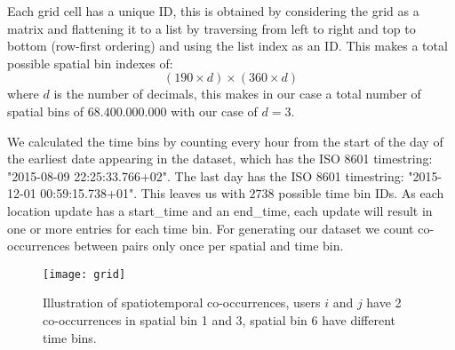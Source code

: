 Each grid cell has a unique ID, this is obtained by considering the grid as a matrix and flattening it to a list by traversing from left to right and top to bottom (row-first ordering) and using the list index as an ID. This makes a total possible spatial bin indexes of: $$(190\times d)\times(360\times d)$$ where $d$ is the number of decimals, this makes in our case a total number of spatial bins of $68.400.000.000$ with our case of $d=3$.

We calculated the time bins by counting every hour from the start of the day of the earliest date appearing in the dataset, which has the ISO 8601 timestring: "2015-08-09 22:25:33.766+02". The last day has the ISO 8601 timestring: "2015-12-01 00:59:15.738+01". This leaves us with $2738$ possible time bin IDs. As each location update has a start\_time and an end\_time, each update will result in one or more entries for each time bin. For generating our dataset we count co-occurrences between pairs only once per spatial and time bin.
\begin{figure}[H]
    \hspace*{-1.0cm}
    \centering
    \texttt{[image: grid]}
    \caption{Illustration of spatiotemporal co-occurrences, users $i$ and $j$ have 2 co-occurrences in spatial bin 1 and 3, spatial bin 6 have different time bins.}
    \label{fig:binning}
\end{figure}

